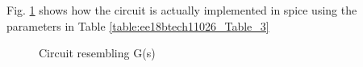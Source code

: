 \begin{enumerate}[label=\arabic*.,ref=\theenumi]
Fig. \ref{fig:ee18btech110026_circuit_2} shows how the circuit is actually implemented in spice using the parameters in Table \ref{table:ee18btech11026_Table_3}  

\begin{figure}[!ht]
	\begin{center}
				\resizebox{\columnwidth}{!}{}
	\end{center}
\caption{Circuit resembling G(s)}
\label{fig:ee18btech110026_circuit_2}
\end{figure}

\begin{table}[!ht]
\centering

\caption{}
\label{table:ee18btech11026_Table_3}
\end{table}

\end{enumerate}

